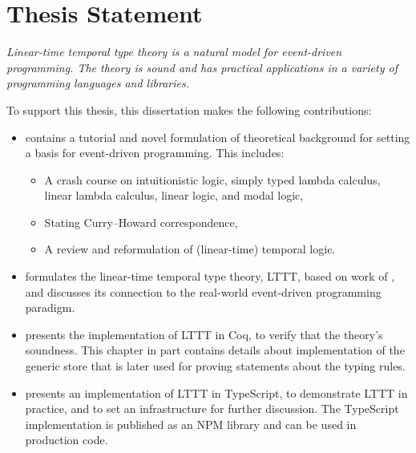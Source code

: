 \section{Thesis Statement}
\textit{Linear-time temporal type theory is a natural model for event-driven programming. The theory is sound and has practical applications in a variety of programming languages and libraries.}

To support this thesis, this dissertation makes the following contributions:

\begin{itemize}
    \item {} contains a tutorial and novel formulation of theoretical background for setting a basis for event-driven programming. This includes:
    \begin{itemize}
        \item A crash course on intuitionistic logic, simply typed lambda calculus, linear lambda calculus, linear logic, and modal logic,
        \item Stating Curry--Howard correspondence,
        \item A review and reformulation of (linear-time) temporal logic.
    \end{itemize}
    \item {} formulates the linear-time temporal type theory, LTTT, based on work of \cite{Paykin2016TheEO}, and discusses its connection to the real-world event-driven programming paradigm.
    \item {} presents the implementation of LTTT in Coq, to verify that the theory's soundness. This chapter in part contains details about implementation of the generic store that is later used for proving statements about the typing rules.
    \item {} presents an implementation of LTTT in TypeScript, to demonstrate LTTT in practice, and to set an infrastructure for further discussion. The TypeScript implementation is published as an NPM library and can be used in production code.
\end{itemize}